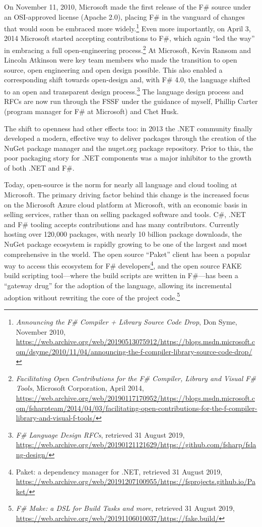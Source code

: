 \documentclass[acmsmall]{acmart}\settopmatter{}
\begin{document}
On November 11, 2010, Microsoft made the first release of the F\# source under an OSI-approved
license (Apache 2.0), placing F\# in the vanguard of changes that would soon be embraced more widely.\footnote{\textit{Announcing the F\# Compiler + Library Source Code Drop}, Don Syme, November 2010, \url{https://web.archive.org/web/20190513075912/https://blogs.msdn.microsoft.com/dsyme/2010/11/04/announcing-the-f-compiler-library-source-code-drop/}}
Even more importantly, on April 3, 2014 Microsoft started accepting contributions to F\#, which again “led the way” in embracing
a full open-engineering process.\footnote{\textit{Facilitating Open Contributions for the F\# Compiler, Library and Visual F\# Tools}, Microsoft Corporation, April 2014, \url{https://web.archive.org/web/20190117170952/https://blogs.msdn.microsoft.com/fsharpteam/2014/04/03/facilitating-open-contributions-for-the-f-compiler-library-and-visual-f-tools/}}
At Microsoft, Kevin Ransom and Lincoln Atkinson were key team members who made the transition to open source, open engineering and open design possible.
This also enabled a corresponding shift towards open-design and, with F\# 4.0, the
language shifted to an open and transparent design process.\footnote{\textit{F\# Language Design RFCs}, retrieved 31 August 2019, \url{https://web.archive.org/web/20190121121629/https://github.com/fsharp/fslang-design/}}
The language design process and RFCs are now run through the FSSF under the guidance of myself, Phillip Carter (program manager for F\# at Microsoft) and Chet Husk.


The shift to openness had other effects too: in 2013 the .NET community finally developed a modern, effective way to
deliver packages through the creation of the NuGet package manager and the nuget.org package repository.  Prior to
this, the poor packaging story for .NET components was a major inhibitor to the growth of both .NET and F\#.  


Today, open-source is the norm for nearly all language and cloud tooling at Microsoft. The primary driving factor
behind this change is the increased focus on the Microsoft Azure cloud platform at Microsoft, with an economic basis in
selling services, rather than on selling packaged software and tools. C\#, .NET and F\# tooling accepts contributions and
has many contributors. Currently hosting over 120,000 packages, with nearly 10 billion package downloads, the NuGet
package ecosystem is rapidly growing to be one of the largest and most comprehensive in the world.  The open source ``Paket''
client has been a popular way to access this ecosystem for F\#
developers\footnote{Paket: a dependency manager for .NET, retrieved 31 August 2019, \url{https://web.archive.org/web/20191207100955/https://fsprojects.github.io/Paket/}}, and
the open source FAKE build scripting tool---where the build scripts are written in F\#---has been a “gateway drug” for the adoption of the language, allowing its
incremental adoption without rewriting the core of the project code.\footnote{\textit{F\# Make: a DSL for Build Tasks and more}, retrieved 31 August 2019, \url{https://web.archive.org/web/20191106010037/https://fake.build/}}
\end{document}
